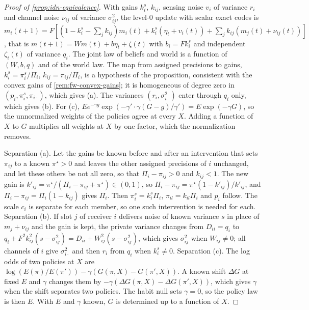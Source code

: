 \begin{proof}[Proof of \cref{prop:idn-equivalence}]
With gains $k^s_i$, $k_{ij}$, sensing noise $v_i$ of variance $r_i$ and channel noise $\nu_{ij}$ of variance $\sigma_{ij}^2$, the level-0 update with scalar exact codes is $m_i(t+1)=F[(1-k^s_i-\sum_jk_{ij})m_i(t)+k^s_i(\eta_t+v_i(t))+\sum_jk_{ij}(m_j(t)+\nu_{ij}(t))]$, that is $m(t+1)=Wm(t)+b\eta_t+\zeta(t)$ with $b_i=Fk^s_i$ and independent $\zeta_i(t)$ of variance $q_i$. The joint law of beliefs and world is a function of $(W,b,q)$ and of the world law. The map from assigned precisions to gains, $k^s_i=\pi^s_i/\Pi_i$, $k_{ij}=\pi_{ij}/\Pi_i$, is a hypothesis of the proposition, consistent with the convex gains of \cref{rem:fw-convex-gains}; it is homogeneous of degree zero in $(p_i,\pi^s_i,\pi_{i\cdot})$, which gives (a). The variances $(r_i,\sigma_{i\cdot}^2)$ enter through $q_i$ only, which gives (b). For (c), $Ee^{-\gamma g}\exp(-\gamma'\cdot\gamma(G-g)/\gamma')=E\exp(-\gamma G)$, so the unnormalized weights of the policies agree at every $X$. Adding a function of $X$ to $G$ multiplies all weights at $X$ by one factor, which the normalization removes.

Separation (a). Let the gains be known before and after an intervention that sets $\pi_{ij}$ to a known $\pi^\star>0$ and leaves the other assigned precisions of $i$ unchanged, and let these others be not all zero, so that $\Pi_i-\pi_{ij}>0$ and $k_{ij}<1$. The new gain is $k'_{ij}=\pi^\star/(\Pi_i-\pi_{ij}+\pi^\star)\in(0,1)$, so $\Pi_i-\pi_{ij}=\pi^\star(1-k'_{ij})/k'_{ij}$, and $\Pi_i-\pi_{ij}=\Pi_i(1-k_{ij})$ gives $\Pi_i$. Then $\pi^s_i=k^s_i\Pi_i$, $\pi_{il}=k_{il}\Pi_i$ and $p_i$ follow. The scale $c_i$ is separate for each member, so one such intervention is needed for each. Separation (b). If slot $j$ of receiver $i$ delivers noise of known variance $s$ in place of $m_j+\nu_{ij}$ and the gain is kept, the private variance changes from $D_{ii}=q_i$ to $q_i+F^2k_{ij}^2(s-\sigma_{ij}^2)=D_{ii}+W_{ij}^2(s-\sigma_{ij}^2)$, which gives $\sigma_{ij}^2$ when $W_{ij}\neq0$; all channels of $i$ give $\sigma_{i\cdot}^2$ and then $r_i$ from $q_i$ when $k^s_i\neq0$. Separation (c). The log odds of two policies at $X$ are $\log(E(\pi)/E(\pi'))-\gamma(G(\pi,X)-G(\pi',X))$. A known shift $\Delta G$ at fixed $E$ and $\gamma$ changes them by $-\gamma(\Delta G(\pi,X)-\Delta G(\pi',X))$, which gives $\gamma$ when the shift separates two policies. The habit null sets $\gamma=0$, so the policy law is then $E$. With $E$ and $\gamma$ known, $G$ is determined up to a function of $X$.
\end{proof}

